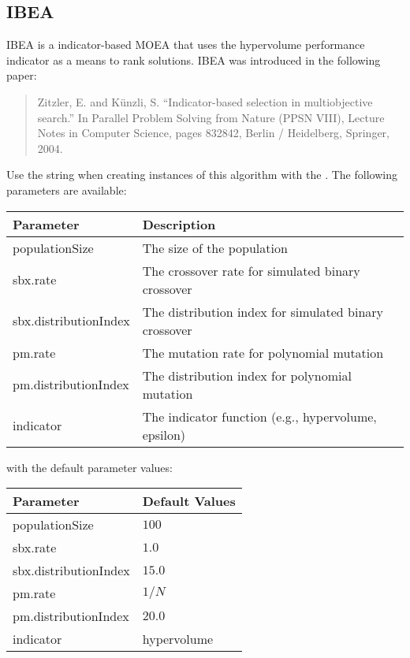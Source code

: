 \subsection{IBEA}
IBEA is a indicator-based MOEA that uses the hypervolume performance indicator as a means to rank solutions.  IBEA was introduced in the following paper:
\begin{quote}
Zitzler, E. and K\"unzli, S.  ``Indicator-based selection in multiobjective search.'' In Parallel Problem Solving from Nature (PPSN VIII), Lecture Notes in Computer Science, pages 832842, Berlin / Heidelberg, Springer, 2004.
\end{quote}
Use the string  when creating instances of this algorithm with the .  The following parameters are available:
\newline
\newline
\begin{tabularx}{\linewidth}{lX}
  \hline
  Parameter & Description \\
  \hline
  populationSize & The size of the population \\
  sbx.rate & The crossover rate for simulated binary crossover \\
  sbx.distributionIndex & The distribution index for simulated binary crossover \\
  pm.rate & The mutation rate for polynomial mutation \\
  pm.distributionIndex & The distribution index for polynomial mutation \\
  indicator & The indicator function (e.g., hypervolume, epsilon) \\
  \hline
\end{tabularx}
\newline
\newline
with the default parameter values:
\newline
\newline
\begin{tabularx}{\linewidth}{lX}
  \hline
  Parameter & Default Values \\
  \hline
  populationSize & $100$ \\
  sbx.rate & $1.0$ \\
  sbx.distributionIndex & $15.0$ \\
  pm.rate & $1/N$ \\
  pm.distributionIndex & $20.0$ \\
  indicator & hypervolume \\
  \hline
\end{tabularx}

